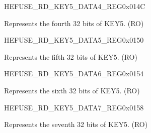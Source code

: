 \begin{register}{H}{EFUSE\_RD\_KEY5\_DATA4\_REG}{0x014C}\label{regdesc:EFUSERDKEY5DATA4REG}
%
\regnewline%
\begin{regdesc}\begin{reglist}
\label{fielddesc:EFUSEKEY5DATA4}\item [EFUSE\_KEY5\_DATA4] Represents the fourth 32 bits of KEY5. (RO)
\end{reglist}\end{regdesc}
\end{register}


\begin{register}{H}{EFUSE\_RD\_KEY5\_DATA5\_REG}{0x0150}\label{regdesc:EFUSERDKEY5DATA5REG}
%
\regnewline%
\begin{regdesc}\begin{reglist}
\label{fielddesc:EFUSEKEY5DATA5}\item [EFUSE\_KEY5\_DATA5] Represents the fifth 32 bits of KEY5. (RO)
\end{reglist}\end{regdesc}
\end{register}


\begin{register}{H}{EFUSE\_RD\_KEY5\_DATA6\_REG}{0x0154}\label{regdesc:EFUSERDKEY5DATA6REG}
%
\regnewline%
\begin{regdesc}\begin{reglist}
\label{fielddesc:EFUSEKEY5DATA6}\item [EFUSE\_KEY5\_DATA6] Represents the sixth 32 bits of KEY5. (RO)
\end{reglist}\end{regdesc}
\end{register}


\begin{register}{H}{EFUSE\_RD\_KEY5\_DATA7\_REG}{0x0158}\label{regdesc:EFUSERDKEY5DATA7REG}
%
\regnewline%
\begin{regdesc}\begin{reglist}
\label{fielddesc:EFUSEKEY5DATA7}\item [EFUSE\_KEY5\_DATA7] Represents the seventh 32 bits of KEY5. (RO)
\end{reglist}\end{regdesc}
\end{register}



